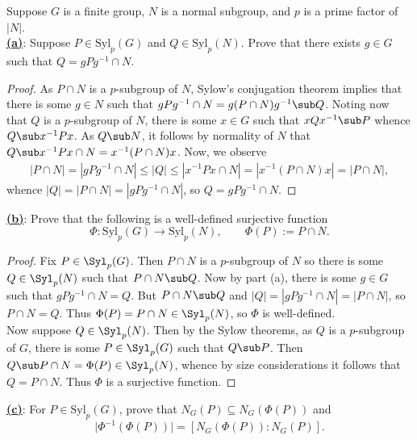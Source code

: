 \documentclass[12pt]{article}
\begin{document}
\begin{homeworkProblem}
  Suppose $G$ is a finite group, $N$ is a normal subgroup, and $p$ is a prime factor of $\lvert N\rvert$.  \ \\

  \underline{\textbf{(a)}}: Suppose $P \in \mathrm{Syl}_p(G)$ and $Q \in \mathrm{Syl}_p(N)$. Prove that there exists $g \in G$ such that $Q = gPg^{-1} \cap N$. \\

  \begin{proof}
    As $ P\cap N $ is a $ p $-subgroup of $ N $, Sylow's conjugation theorem implies that there is some $ g\in N $ such that $ gPg^{-1}\cap N = g(P\cap N)g^{-1} \sub Q $. Noting now that $ Q $ is a $ p $-subgroup of $ N $, there is some $ x\in G $ such that $ xQx^{-1}\sub P $ whence $ Q\sub x^{-1}Px $. As $ Q\sub N $, it follows by normality of $ N $ that $ Q\sub x^{-1}Px \cap N = x^{-1}(P\cap N)x $. Now, we observe
    \begin{align*}
      |P\cap N| =|gPg^{-1}\cap N| \leq |Q| \leq |x^{-1}Px\cap N| = |x^{-1}(P\cap N)x| = |P\cap N|,
    \end{align*}
    whence $ |Q| = |P\cap N| = |gPg^{-1}\cap N| $, so $ Q = gPg^{-1}\cap N $.
  \end{proof}


  \underline{\textbf{(b)}}: Prove that the following is a well-defined surjective function
  \[
    \Phi : \mathrm{Syl}_p(G) \to \mathrm{Syl}_p(N), \qquad \Phi(P) := P \cap N.
  \]

  \begin{proof}
    Fix $ P\in \Syl_{p}(G) $. Then $ P\cap N $ is a $ p $-subgroup of $ N $ so there is some $ Q\in \Syl_{p}(N) $ such that $ P\cap N\sub Q $. Now by part (a), there is some $ g\in G $ such that $ gPg^{-1}\cap N = Q $. But $ P\cap N\sub Q $ and $ |Q| = |gPg^{-1}\cap N| = |P\cap N| $, so $ P\cap N = Q $. Thus $ \Phi(P) = P\cap N\in \Syl_{p}(N) $, so $ \Phi $ is well-defined.\\

    Now suppose $ Q\in \Syl_{p}(N) $. Then by the Sylow theorems, as $ Q $ is a $ p $-subgroup of $ G $, there is some $ P\in \Syl_{p}(G) $ such that $ Q\sub P $. Then $ Q\sub P\cap N = \Phi(P)\in \Syl_{p}(N) $, whence by size considerations it follows that $ Q = P\cap N $. Thus $ \Phi $ is a surjective function.
  \end{proof}

  \underline{\textbf{(c)}}: For $P \in \mathrm{Syl}_p(G)$, prove that $N_G(P) \subseteq N_G(\Phi(P))$ and
  \[
    \lvert \Phi^{-1}(\Phi(P)) \rvert = [N_G(\Phi(P)) : N_G(P)].
  \]


\end{homeworkProblem}
\end{document}
